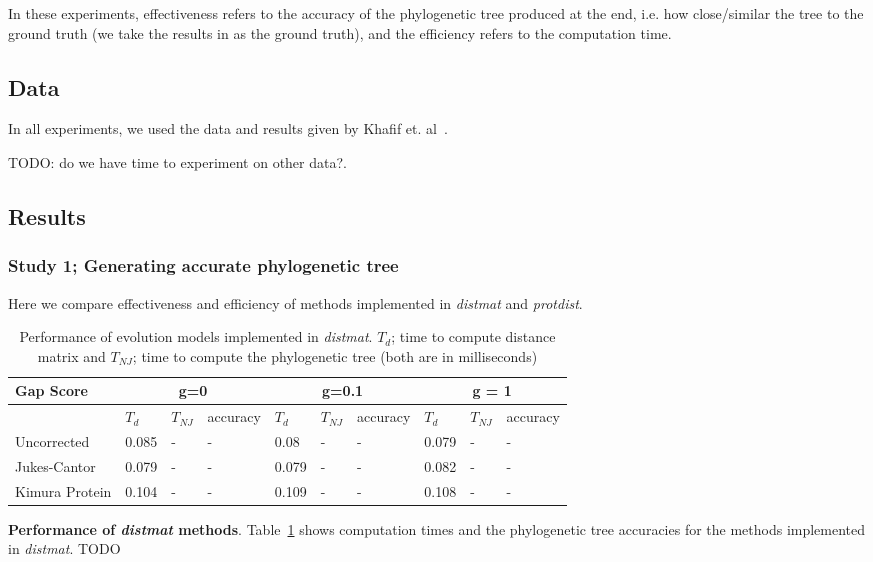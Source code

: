 \documentclass[11pt,letterpaper]{article}
\theoremstyle{definition}
\begin{document}
In these experiments, effectiveness refers to the accuracy of the phylogenetic tree produced at the end, i.e. how close/similar the tree to the ground truth (we take the results in \cite{khafif2014identification} as the ground truth), and the efficiency refers to the computation time. 

\subsection{Data}

In all experiments, we used the data and results given by Khafif et. al~\cite{khafif2014identification}. 

TODO: do we have time to experiment on other data?. 

\subsection{Results}

\subsubsection{Study 1; Generating accurate phylogenetic tree}

Here we compare effectiveness and efficiency of methods implemented in \textit{distmat} and \textit{protdist}. 

\begin{table}[!h]
\centering
	\begin{tabular}{l|lll|lll|lll}

Gap Score	& \multicolumn{3}{c}{g=0} & \multicolumn{3}{c}{g=0.1} &  \multicolumn{3}{c}{g = 1} \\
\hline
&	$T_d$	& $T_{NJ}$	& accuracy &	$T_d$	& $T_{NJ}$	& accuracy &	$T_d$	& $T_{NJ}$	& accuracy \\
\hline
Uncorrected		&	0.085	&	-	&	-	&	0.08	&	-	&	-	&	0.079	&	-	&	-	\\
Jukes-Cantor	&	0.079	&	-	&	-	&	0.079	&	-	&	-	&	0.082	&	-	&	-	\\
Kimura Protein	&	0.104	&	-	&	-	&	0.109	&	-	&	-	&	0.108	&	-	&	-	\\
\hline
\end{tabular}
\caption{Performance of evolution models implemented in \textit{distmat}. 
$T_d$; time to compute distance matrix and $T_{NJ}$; time to compute the phylogenetic tree (both are in milliseconds)}\label{tab:dist1}
\end{table}


\textbf{Performance of \textit{distmat} methods}. Table~\ref{tab:dist1}  shows computation times and the phylogenetic tree accuracies for the methods implemented in \textit{distmat}. TODO
\end{document}
